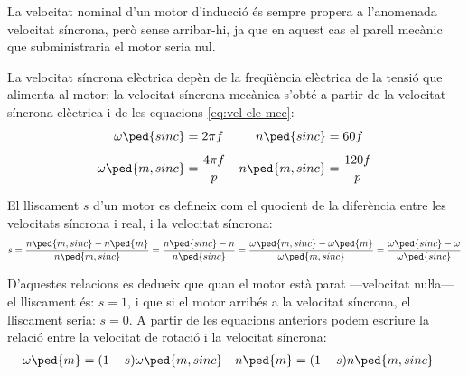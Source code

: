 La velocitat nominal d'un motor d'inducció és sempre propera a l'anomenada velocitat síncrona, però sense arribar-hi, ja que en aquest cas el parell mecànic que subministraria el motor seria nul.

La velocitat síncrona elèctrica depèn de la freqüència elèctrica de la tensió que alimenta al motor; la velocitat síncrona mecànica s'obté a partir de la velocitat síncrona elèctrica i de  les equacions \eqref{eq:vel-ele-mec}:
\begin{subequations}\index{motors d'inducció!velocitat síncrona}
\begin{align}
    \omega\ped{sinc} &= 2 \pi f & n\ped{sinc} &= 60 f \\[1ex]
    \omega\ped{m,sinc} &= \frac{4 \pi f}{p} & n\ped{m,sinc} &= \frac{120 f}{p}\label{eq:vel-mec-sinc}
\end{align}
\end{subequations}

El lliscament $s$ d'un motor es defineix com el quocient de la diferència entre les velocitats síncrona  i real, i la velocitat síncrona:
\begin{equation}\label{eq:lliscament}\index{lliscament}
    s = \frac{n\ped{m,sinc}-n\ped{m}}{n\ped{m,sinc}} =
    \frac{n\ped{sinc}-n}{n\ped{sinc}} =
    \frac{\omega\ped{m,sinc}-\omega\ped{m}}{\omega\ped{m,sinc}} =
    \frac{\omega\ped{sinc}-\omega}{\omega\ped{sinc}}
\end{equation}

D'aquestes relacions es dedueix que quan el motor està parat ---velocitat nuŀla--- el lliscament és: $s=1$, i que si el motor arribés a la velocitat síncrona, el lliscament seria: $s=0$. A partir de les equacions anteriors podem escriure la relació entre la velocitat de rotació i la velocitat síncrona:
\begin{align}
    \omega\ped{m} &= (1-s) \omega\ped{m,sinc} & n\ped{m} &= (1-s) n\ped{m,sinc} \label{eq:wm-wsinc}
\end{align}


